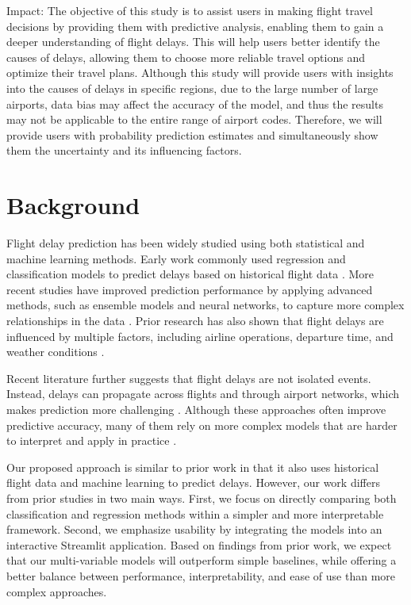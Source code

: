 Impact: The objective of this study is to assist users in making flight travel decisions by providing them with predictive analysis, enabling them to gain a deeper understanding of flight delays. This will help users better identify the causes of delays, allowing them to choose more reliable travel options and optimize their travel plans. Although this study will provide users with insights into the causes of delays in specific regions, due to the large number of large airports, data bias may affect the accuracy of the model, and thus the results may not be applicable to the entire range of airport codes. Therefore, we will provide users with probability prediction estimates and simultaneously show them the uncertainty and its influencing factors.

\section{Background}

Flight delay prediction has been widely studied using both statistical and machine learning methods. Early work commonly used regression and classification models to predict delays based on historical flight data \cite{tang2021airline}. More recent studies have improved prediction performance by applying advanced methods, such as ensemble models and neural networks, to capture more complex relationships in the data \cite{jiang2020aviation}. Prior research has also shown that flight delays are influenced by multiple factors, including airline operations, departure time, and weather conditions \cite{choi2016weather}.

Recent literature further suggests that flight delays are not isolated events. Instead, delays can propagate across flights and through airport networks, which makes prediction more challenging \cite{chen2019chained, wu2019propagation}. Although these approaches often improve predictive accuracy, many of them rely on more complex models that are harder to interpret and apply in practice \cite{zoutendijk2021probabilistic}.

Our proposed approach is similar to prior work in that it also uses historical flight data and machine learning to predict delays. However, our work differs from prior studies in two main ways. First, we focus on directly comparing both classification and regression methods within a simpler and more interpretable framework. Second, we emphasize usability by integrating the models into an interactive Streamlit application. Based on findings from prior work, we expect that our multi-variable models will outperform simple baselines, while offering a better balance between performance, interpretability, and ease of use than more complex approaches.


